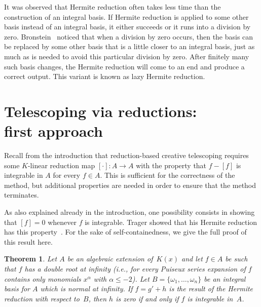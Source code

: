 \documentclass{sig-alternate}
\newtheorem{theorem}{Theorem}
\begin{document}
It was observed that Hermite reduction often takes less time than the construction
of an integral basis. If Hermite reduction is applied to some other basis instead
of an integral basis, it either succeeds or it runs into a division by zero. 
Bronstein~\cite{bronstein98a} noticed that when a division by zero occurs, then the basis can
be replaced by some other basis that is a little closer to an integral basis, just
as much as is needed to avoid this particular division by zero. After finitely many
such basis changes, the Hermite reduction will come to an end and produce a correct
output. This variant is known as lazy Hermite reduction.

\section{Telescoping via reductions: \\ first approach} \label{SECT:CT-1}
Recall from the introduction that reduction-based creative telescoping requires
some $K$-linear reduction map $[\cdot]\colon A\to A$ with the property that
$f-[f]$ is integrable in $A$ for every $f\in A$. This is sufficient for the
correctness of the method, but additional properties are needed in order to
ensure that the method terminates.

As also explained already in the introduction, one possibility consists in
showing that $[f]=0$ whenever $f$ is integrable. Trager showed that his
Hermite reduction has this property~\cite[page 50, Theorem 1]{trager84}. For the sake of self-containedness,
we give the full proof of this result here.

\begin{theorem}\label{thm:intiff0}
  Let $A$ be an algebraic extension of~$K(x)$ and let $f\in A$ be such that
  $f$ has a double root at infinity (i.e., for every Puiseux series expansion
  of $f$ contains only monomials $x^\alpha$ with $\alpha\leq-2$). Let $B=\{\omega_1,\dots,\omega_n\}$
  be an integral basis for $A$ which is normal at infinity.
  If $f=g'+h$ is the result of the Hermite reduction with respect to~$B$,
  then $h$ is zero if and only if $f$ is integrable in~$A$.
\end{theorem}
\end{document}
